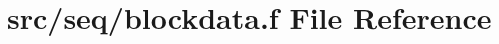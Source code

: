 \hypertarget{seq_2blockdata_8f}{\section{src/seq/blockdata.f File Reference}
\label{seq_2blockdata_8f}
}
